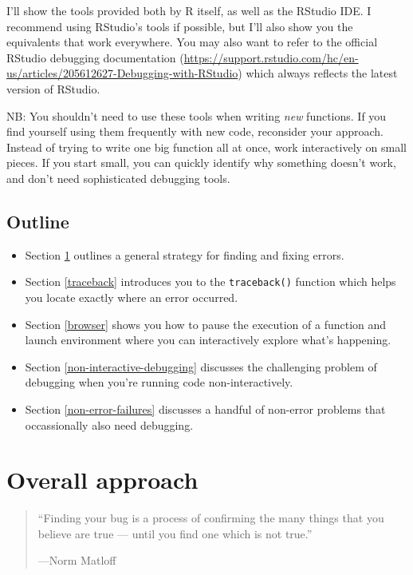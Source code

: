 \documentclass[]{book}
\renewcommand{\href}[2]{#2 (\url{#1})}
\begin{document}
I'll show the tools provided both by R itself, as well as the RStudio IDE. I recommend using RStudio's tools if possible, but I'll also show you the equivalents that work everywhere. You may also want to refer to the official \href{https://support.rstudio.com/hc/en-us/articles/205612627-Debugging-with-RStudio}{RStudio debugging documentation} which always reflects the latest version of RStudio.

NB: You shouldn't need to use these tools when writing \emph{new} functions. If you find yourself using them frequently with new code, reconsider your approach. Instead of trying to write one big function all at once, work interactively on small pieces. If you start small, you can quickly identify why something doesn't work, and don't need sophisticated debugging tools.

\hypertarget{outline-5}{%
\subsection*{Outline}\label{outline-5}}

\begin{itemize}
\item
  Section \ref{debugging-strategy} outlines a general strategy for
  finding and fixing errors.
\item
  Section \ref{traceback} introduces you to the \texttt{traceback()} function
  which helps you locate exactly where an error occurred.
\item
  Section \ref{browser} shows you how to pause the execution of a function
  and launch environment where you can interactively explore what's happening.
\item
  Section \ref{non-interactive-debugging} discusses the challenging problem
  of debugging when you're running code non-interactively.
\item
  Section \ref{non-error-failures} discusses a handful of non-error problems
  that occassionally also need debugging.
\end{itemize}

\hypertarget{debugging-strategy}{%
\section{Overall approach}\label{debugging-strategy}}

\begin{quote}
``Finding your bug is a process of confirming the many things
that you believe are true --- until you find one which is not
true.''

\hspace*{\fill} ---Norm Matloff
\end{quote}
\end{document}
